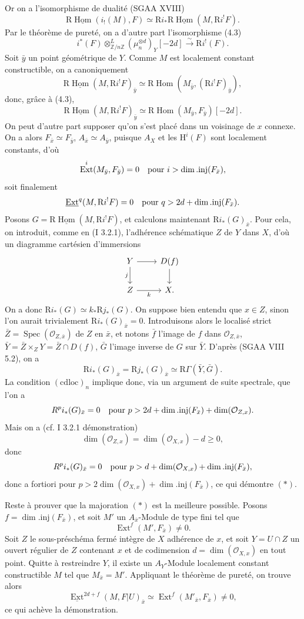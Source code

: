 \documentclass[11pt]{article}
\renewcommand{\H}{\mathrm{H}}
\DeclareMathOperator{\Hom}{Hom}
\DeclareMathOperator{\Ext}{Ext}
\DeclareMathOperator{\Spec}{Spec}
\newcommand{\R}{\mathrm{R}}
\newcommand{\Z}{\mathbb{Z}}
\providecommand{\Hom}{\operatorname{Hom}}
\providecommand{\R}{\mathrm R}
\providecommand{\Z}{\mathbb Z}
\providecommand{\Spec}{\operatorname{Spec}}
\providecommand{\Spec}{\operatorname{Spec}}
\providecommand{\Hom}{\operatorname{Hom}}
\providecommand{\Spec}{\operatorname{Spec}}
\providecommand{\Spec}{\operatorname{Spec}}
\begin{document}
Or on a l'isomorphisme de dualité (SGAA XVIII)
\[
        \R\underline{\Hom}(i_!(M),F)\simeq \R i_*\R\underline{\Hom}(M,\R i^!F).
\]
Par le théorème de pureté, on a d'autre part l'isomorphisme (4.3)
\[
        i^*(F)\otimes^L_{\Z/n\Z}(\mu_n^{\otimes d})_Y[-2d]\xrightarrow{\sim}\R i^!(F).
\]
Soit $\bar{y}$ un point géométrique de $Y$. Comme $M$ est localement constant constructible, on a canoniquement
\[
        \R\underline{\Hom}(M,\R i^!F)_{\bar{y}}\simeq \R\Hom(M_{\bar{y}},(\R i^!F)_{\bar{y}}),
\]
donc, grâce à (4.3),
\[
        \R\underline{\Hom}(M,\R i^!F)_{\bar{y}}\simeq \R\Hom(M_{\bar{y}},F_{\bar{y}})[-2d].
\]
On peut d'autre part supposer qu'on s'est placé dans un voisinage de $x$ connexe. On a alors $F_{\bar{x}}\simeq F_{\bar{y}}$, $A_{\bar{x}}\simeq A_{\bar{y}}$, puisque $A_X$ et les $\H^i(F)$ sont localement constants, d'où
\[
        \Ext^i(M_{\bar{y}},F_{\bar{y}})=0\quad\hbox{pour }i>\dim.\mathrm{inj}(F_{\bar{x}}),
\]
soit finalement
\[
        \underline{\Ext}^{q}(M,\R i^!F)=0\quad\hbox{pour }q>2d+\dim.\mathrm{inj}(F_{\bar{x}}).
\]
Posons $G=\R\underline{\Hom}(M,\R i^!F)$, et calculons maintenant $\R i_*(G)_{\bar{x}}$. Pour cela, on introduit, comme en (I 3.2.1), l'adhérence schématique $Z$ de $Y$ dans $X$, d'où un diagramme cartésien d'immersions
\[
\begin{tikzcd}
Y \arrow[r] \arrow[d,"j"'] & D(f) \arrow[d]\\
Z \arrow[r,"k"'] & X.
\end{tikzcd}
\]
On a donc $\R i_*(G)\simeq k_*\R j_*(G)$. On suppose bien entendu que $x\in Z$, sinon l'on aurait trivialement $\R i_*(G)_{\bar{x}}=0$. Introduisons alors le localisé strict $\bar{Z}=\Spec(\mathcal{O}_{Z,\bar{x}})$ de $Z$ en $\bar{x}$, et notons $\bar{f}$ l'image de $f$ dans $\mathcal{O}_{Z,\bar{x}}$, $\bar{Y}=\bar{Z}\times_ZY=\bar{Z}\cap D(f)$, $\bar{G}$ l'image inverse de $G$ sur $\bar{Y}$. D'après (SGAA VIII 5.2), on a
\[
        \R i_*(G)_{\bar{x}}=\R j_*(G)_{\bar{x}}\simeq \R\Gamma(\bar{Y},\bar{G}).
\]
La condition $(\mathrm{cdloc})_n$ implique donc, via un argument de suite spectrale, que l'on a
\[
        R^p i_*(G)_{\bar{x}}=0\quad\hbox{pour }p>2d+\dim.\mathrm{inj}(F_{\bar{x}})+\dim(\mathcal{O}_{Z,x}).
\]
Mais on a (cf. I 3.2.1 démonstration)
\[
        \dim(\mathcal{O}_{Z,x})=\dim(\mathcal{O}_{X,x})-d\geq0,
\]
donc
\[
        R^p i_*(G)_{\bar{x}}=0\quad\hbox{pour }p>d+\dim(\mathcal{O}_{X,x})+\dim.\mathrm{inj}(F_{\bar{x}}),
\]
donc a fortiori pour $p>2\dim(\mathcal{O}_{X,x})+\dim.\mathrm{inj}(F_{\bar{x}})$, ce qui démontre $(*)$.

Reste à prouver que la majoration $(*)$ est la meilleure possible. Posons $f=\dim.\mathrm{inj}(F_{\bar{x}})$, et soit $M'$ un $A_{\bar{x}}$-Module de type fini tel que
\[
        \Ext^f(M',F_{\bar{x}})\neq0.
\]
Soit $Z$ le sous-préschéma fermé intègre de $X$ adhérence de $x$, et soit $Y=U\cap Z$ un ouvert régulier de $Z$ contenant $x$ et de codimension $d=\dim(\mathcal{O}_{X,x})$ en tout point. Quitte à restreindre $Y$, il existe un $A_Y$-Module localement constant constructible $M$ tel que $M_{\bar{x}}=M'$. Appliquant le théorème de pureté, on trouve alors
\[
        \underline{\Ext}^{2d+f}(M,F|U)_{\bar{x}}\simeq \Ext^f(M'_{\bar{x}},F_{\bar{x}})\neq0,
\]
ce qui achève la démonstration.
\end{document}
